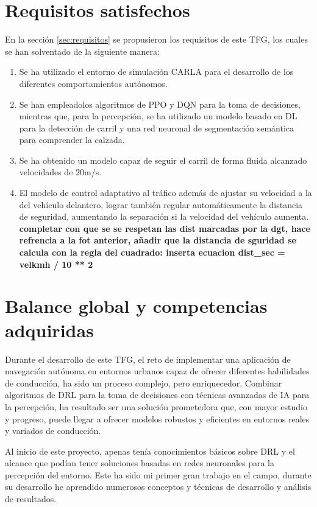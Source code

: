 \section{Requisitos satisfechos}

En la sección \ref{sec:requisitos} se propusieron los requisitos de este \ac{TFG}, los cuales se han solventado de la siguiente manera:

\begin{enumerate}
\item Se ha utilizado el entorno de simulación CARLA para el desarrollo de los diferentes comportamientos autónomos.
\item Se han empleadolos algoritmos de \ac{PPO} y \ac{DQN} para la toma de decisiones, mientras que, para la percepción, se ha utilizado un modelo basado en \ac{DL} para la detección de carril y una red neuronal de segmentación semántica para comprender la calzada.
\item Se ha obtenido un modelo capaz de seguir el carril de forma fluida alcanzado velocidades de 20m/s.
\item El modelo de control adaptativo al tráfico además de ajustar su velocidad a la del vehículo delantero, lograr también regular automáticamente la distancia de seguridad, aumentando la separación si la velocidad del vehículo aumenta. \textbf{completar con que se se respetan las dist marcadas por la dgt, hace refrencia a la fot anterior, añadir que la distancia de sguridad se calcula con la regla del cuadrado: inserta ecuacion dist\_sec = velkmh / 10 ** 2}
\end{enumerate}

\section{Balance global y competencias adquiridas}

Durante el desarrollo de este \ac{TFG}, el reto de implementar una aplicación de navegación autónoma en entornos urbanos capaz de ofrecer diferentes habilidades de conducción, ha sido un proceso complejo, pero enriquecedor. Combinar algoritmos de \ac{DRL} para la toma de decisiones con técnicas avanzadas de \ac{IA} para la percepción, ha resultado ser una solución prometedora que, con mayor estudio y progreso, puede llegar a ofrecer modelos robustos y eficientes en entornos reales y variados de conducción.

Al inicio de este proyecto, apenas tenía conocimientos básicos sobre \ac{DRL} y el alcance que podían tener soluciones basadas en redes neuronales para la percepción del entorno. Este ha sido mi primer gran trabajo en el campo, durante su desarrollo he aprendido numerosos conceptos y técnicas de desarrollo y análisis de resultados.

